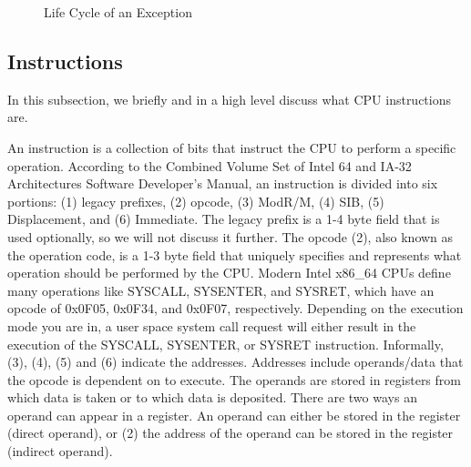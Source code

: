 \documentclass{report}
\begin{document}
\begin{spacing}{1.5}


\begin{figure}[ht]
  \hspace*{1.5cm}
  \caption{Life Cycle of an Exception}
\end{figure}

\subsection{Instructions}

{\large
In this subsection, we briefly and in a high level discuss what CPU instructions are.
\newline
}

{\large
\noindent An instruction is a collection of bits that instruct the CPU to perform a specific operation. According to the Combined Volume Set of Intel 64 and IA-32 Architectures Software Developer’s Manual, an instruction is divided into six portions: (1) legacy prefixes, (2) opcode, (3) ModR/M, (4) SIB, (5) Displacement, and (6) Immediate. The legacy prefix is a 1-4 byte field that is used optionally, so we will not discuss it further. The opcode (2), also known as the operation code, is a 1-3 byte field that uniquely specifies and represents what operation should be performed by the CPU. Modern Intel x86\_64 CPUs define many operations like SYSCALL, SYSENTER, and SYSRET, which have an opcode of 0x0F05, 0x0F34, and 0x0F07, respectively. Depending on the execution mode you are in, a user space system call request will either result in the execution of the SYSCALL, SYSENTER, or SYSRET instruction. Informally, (3), (4), (5) and (6) indicate the addresses. Addresses include operands/data that the opcode is dependent on to execute. The operands are stored in registers from which data is taken or to which data is deposited. There are two ways an operand can appear in a register. An operand can either be stored in the register (direct operand), or (2) the address of the operand can be stored in the register (indirect operand).
\newline
}




\end{spacing}
\end{document}
